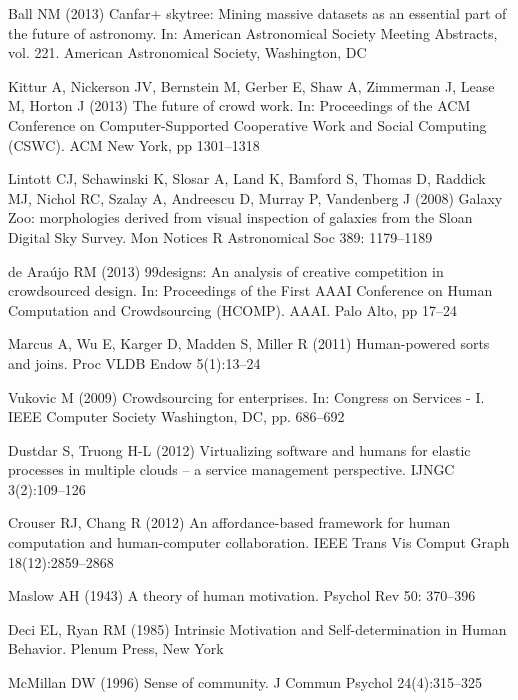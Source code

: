 \documentclass[11pt]{bmc_article_s50}
\begin{document}
\begin{thebibliography}{000}
Ball NM (2013)
{Canfar+ skytree: Mining massive datasets as an essential part of the
  future of astronomy}.
In: {American Astronomical Society Meeting Abstracts},
vol. {221}.
{American Astronomical Society},
{Washington, DC}


Kittur A,
Nickerson JV,
Bernstein M,
Gerber E,
Shaw A,
Zimmerman J,
Lease M,
Horton J (2013)
{The future of crowd work}.
In: {Proceedings of the ACM Conference on Computer-Supported
  Cooperative Work and Social Computing (CSWC)}.
{ACM}
{New York},
pp 1301--{1318}

{Lintott} CJ,
{Schawinski} K,
{Slosar} A,
{Land} K,
{Bamford} S,
{Thomas} D,
{Raddick} MJ,
{Nichol} RC,
{Szalay} A,
{Andreescu} D,
{Murray} P,
{Vandenberg} J (2008)
{Galaxy Zoo: morphologies derived from visual inspection of galaxies from the
  Sloan Digital Sky Survey}.
Mon Notices R Astronomical Soc
{389}:
1179--{1189}


de Ara{\'u}jo RM (2013)
{99designs: An analysis of creative competition in crowdsourced
  design}.
In: {Proceedings of the First AAAI Conference on Human Computation and
  Crowdsourcing (HCOMP)}.
{AAAI}.
{Palo Alto,} pp 17--{24}


Marcus A,
Wu E,
Karger D,
Madden S,
Miller R (2011)
{Human-powered sorts and joins}.
{Proc VLDB Endow}
{5}(1):13--{24}



Vukovic M (2009)
{Crowdsourcing for enterprises}.
In: {Congress on Services - I}.
{IEEE Computer Society}
{Washington, DC}, pp. 686--{692}

Dustdar S,
Truong H-L (2012)
{Virtualizing software and humans for elastic processes in multiple clouds -- a
  service management perspective}.
IJNGC
{3}(2):109--{126}


Crouser RJ,
Chang R (2012)
An affordance-based framework for human computation and human-computer
  collaboration.
IEEE Trans Vis Comput Graph
{18}(12):2859--2868


Maslow AH (1943)
{A theory of human motivation}.
{Psychol Rev}
{50}:
370--{396}



Deci EL,
Ryan RM (1985)
{Intrinsic Motivation and Self-determination in Human Behavior}.
{Plenum Press},
{New York}



McMillan DW (1996)
{Sense of community}.
{J Commun Psychol}
{24}(4):315--{325}




\end{thebibliography}
\end{document}
